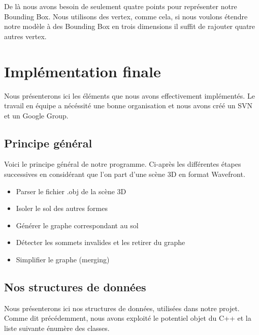 \documentclass[a4paper,12pt]{report}
\begin{document}
\newpage
De là nous avons besoin de seulement quatre points pour représenter notre Bounding Box. Nous utilisons des vertex, comme cela, si nous voulons étendre notre modèle à des Bounding Box en trois dimensions il suffit de rajouter quatre autres vertex.

\chapter{Implémentation finale}

Nous présenterons ici les éléments que nous avons effectivement implémentés. Le travail en équipe a nécéssité une bonne organisation et nous avons créé un SVN et un Google Group.

\section{Principe général}

Voici le principe général de notre programme. Ci-après les différentes étapes successives en considérant que l'on part d'une scène 3D en format Wavefront.

\begin{itemize}
 \item Parser le fichier .obj de la scène 3D
 \item Isoler le sol des autres formes
 \item Générer le graphe correspondant au sol
 \item Détecter les sommets invalides et les retirer du graphe
 \item Simplifier le graphe (merging)
\end{itemize}

\section{Nos structures de données}

Nous présenterons ici nos structures de données, utilisées dans notre projet. Comme dit précédemment, nous avons exploité le potentiel objet du C++ et la liste suivante énumère des classes.
\end{document}
